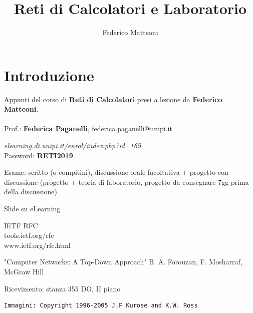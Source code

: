 \documentclass[10pt]{article}
\begin{document}
\title{Reti di Calcolatori e Laboratorio}
\author{Federico Matteoni}
\date{ }
\renewcommand*\contentsname{Indice}

\maketitle
\begin{multicols}{2}
\tableofcontents
\end{multicols}
\pagebreak
\section{Introduzione}
Appunti del corso di \textbf{Reti di Calcolatori} presi a lezione da \textbf{Federico Matteoni}.\\\\
Prof.: \textbf{Federica Paganelli}, federica.paganelli@unipi.it\\
\begin{list}{-}{Riferimenti web:}
\item \emph{elearning.di.unipi.it/enrol/index.php?id=169}\\Password: \textbf{RETI2019}
\end{list}
Esame: scritto (o compitini), discussione orale facoltativa + progetto con discussione (progetto + teoria di laboratorio, progetto da consegnare 7gg prima della discussione)\\
\begin{list}{-}{Libri e materiale didattico:}
\item Slide su eLearning
\item IETF RFC\\tools.ietf.org/rfc\\www.ietf.org/rfc.html
\item "Computer Networks: A Top-Down Approach" B. A. Forouzan, F. Mosharraf, McGraw Hill
\end{list}
Ricevimento: stanza 355 DO, II piano

\begin{verbatim}
Immagini: Copyright 1996-2005 J.F Kurose and K.W. Ross
\end{verbatim}
\pagebreak
\end{document}
